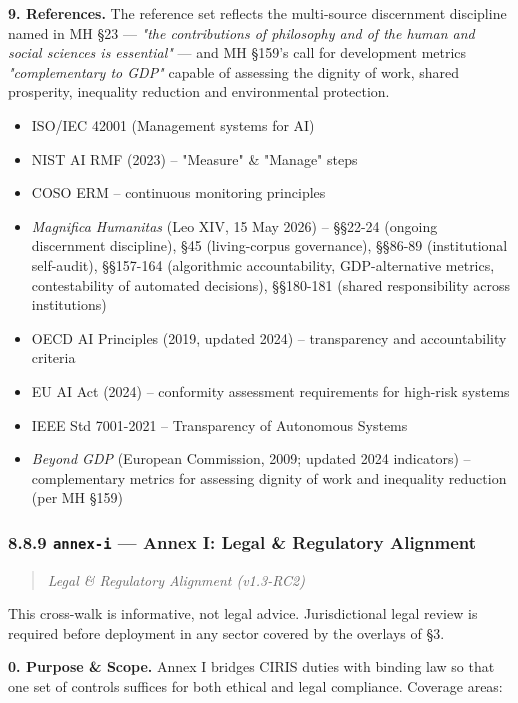 \documentclass[11pt]{article}
\begin{document}
\textbf{9. References.} The reference set reflects the multi-source discernment discipline named in MH §23 — \textit{"the contributions of philosophy and of the human and social sciences is essential"} — and MH §159's call for development metrics \textit{"complementary to GDP"} capable of assessing the dignity of work, shared prosperity, inequality reduction and environmental protection.


\begin{itemize}\setlength\itemsep{0pt}
\item ISO/IEC 42001 (Management systems for AI)
\item NIST AI RMF (2023) – "Measure" \& "Manage" steps
\item COSO ERM – continuous monitoring principles
\item \textit{Magnifica Humanitas} (Leo XIV, 15 May 2026) – §§22-24 (ongoing discernment discipline), §45 (living-corpus governance), §§86-89 (institutional self-audit), §§157-164 (algorithmic accountability, GDP-alternative metrics, contestability of automated decisions), §§180-181 (shared responsibility across institutions)
\item OECD AI Principles (2019, updated 2024) – transparency and accountability criteria
\item EU AI Act (2024) – conformity assessment requirements for high-risk systems
\item IEEE Std 7001-2021 – Transparency of Autonomous Systems
\item \textit{Beyond GDP} (European Commission, 2009; updated 2024 indicators) – complementary metrics for assessing dignity of work and inequality reduction (per MH §159)
\end{itemize}


\subsubsection*{8.8.9 \texttt{annex-i} — Annex I: Legal \& Regulatory Alignment}


\begin{quote}\itshape Legal \& Regulatory Alignment (v1.3-RC2)\end{quote}


This cross-walk is informative, not legal advice. Jurisdictional legal review is required before deployment in any sector covered by the overlays of §3.


\textbf{0. Purpose \& Scope.} Annex I bridges CIRIS duties with binding law so that one set of controls suffices for both ethical and legal compliance. Coverage areas:
\end{document}
